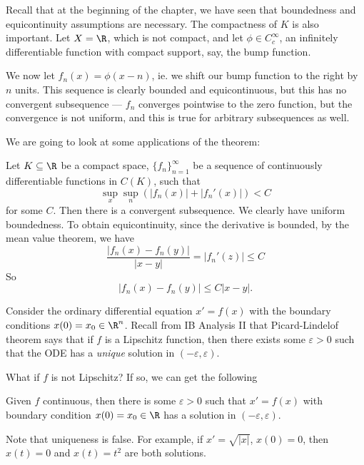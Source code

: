 \documentclass[a4paper]{article}
\begin{document}
Recall that at the beginning of the chapter, we have seen that boundedness and equicontinuity assumptions are necessary. The compactness of $K$ is also important. Let $X = \R$, which is not compact, and let $\phi \in C_c^{\infty}$, an infinitely differentiable function with compact support, say, the bump function.
\begin{center}
\end{center}
We now let $f_n(x) = \phi(x - n)$, ie. we shift our bump function to the right by $n$ units. This sequence is clearly bounded and equicontinuous, but this has no convergent subsequence --- $f_n$ converges pointwise to the zero function, but the convergence is not uniform, and this is true for arbitrary subsequences as well.

We are going to look at some applications of the theorem:

\begin{eg}
  Let $K\subseteq \R$ be a compact space, $\{f_n\}_{n = 1}^\infty$ be a sequence of continuously differentiable functions in $C(K)$, such that
  \[
    \sup_x \sup_n (|f_n(x)| + |f_n'(x)|) < C
  \]
  for some $C$. Then there is a convergent subsequence. We clearly have uniform boundedness. To obtain equicontinuity, since the derivative is bounded, by the mean value theorem, we have
  \[
    \frac{|f_n(x) - f_n(y)|}{|x - y|} = |f_n'(z)| \leq C
  \]
  So
  \[
    |f_n(x) - f_n(y)| \leq C |x - y|.
  \]
\end{eg}

Consider the ordinary differential equation $x' = f(x)$ with the boundary conditions $x(0) = x_0 \in \R^n$. Recall from IB Analysis II that Picard-Lindelof theorem says that if $f$ is a Lipschitz function, then there exists some $\varepsilon > 0$ such that the ODE has a \emph{unique} solution in $(-\varepsilon, \varepsilon)$.

What if $f$ is not Lipschitz? If so, we can get the following
\begin{thm}[Peano*]
  Given $f$ continuous, then there is some  $\varepsilon > 0$ such that $x' = f(x)$ with boundary condition $x(0) = x_0 \in \R$ has a solution in $(-\varepsilon, \varepsilon)$.
\end{thm}
Note that uniqueness is false. For example, if $x' = \sqrt{|x|}$, $x(0) = 0$, then $x(t) = 0$ and $x(t) = t^2$ are both solutions.
\end{document}
